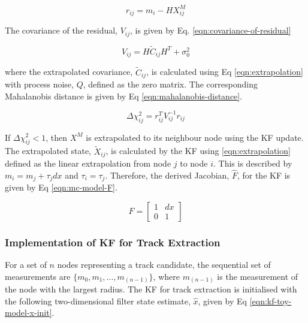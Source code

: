 \begin{equation}
r_{ij} = m_i - HX_{ij}^M
\label{eqn:residual}
\end{equation}

The covariance of the residual, $V_{ij}$, is given by Eq. \eqref{eqn:covariance-of-residual}

\begin{equation}
{V}_{ij} = H \widetilde{C}_{ij} H^{T} + \sigma_{0}^{2}
\label{eqn:covariance-of-residual}
\end{equation}

where the extrapolated covariance, $\widetilde{C}_{ij}$, is calculated using Eq \eqref{eqn:extrapolation} with process noise, $Q$, defined as the zero matrix. The corresponding Mahalanobis distance is given by Eq \eqref{eqn:mahalanobis-distance}.

\begin{equation}
\Delta \chi_{ij}^{2} = r_{ij}^{T} {V}_{ij}^{-1} r_{ij}
\label{eqn:mahalanobis-distance}
\end{equation}

If $\Delta \chi_{ij}^{2} < 1$, then $X^M$ is extrapolated to its neighbour node using the KF update. The extrapolated state, $\widetilde{X}_{ij}$, is calculated by the KF using \eqref{eqn:extrapolation} defined as the linear extrapolation from node $j$ to node $i$. This is described by $m_i = m_j + \tau_j dx$ and $\tau_i = \tau_j$. Therefore, the derived Jacobian, $\hat{F}$, for the KF is given by Eq \eqref{eqn:mc-model-F}.


\begin{equation}
\hat{F} = \begin{bmatrix} 1 & dx \\ 0 & 1 \end{bmatrix}
\label{eqn:mc-model-F}
\end{equation}



\subsubsection{Implementation of KF for Track Extraction}

For a set of $n$ nodes representing a track candidate, the sequential set of measurements are $\{m_0, m_1, ..., m_{(n-1)} \}$, where $m_{(n-1)}$ is the measurement of the node with the largest radius. The KF for track extraction is initialised with the following two-dimensional filter state estimate, $\hat{x}$, given by Eq \eqref{eqn:kf-toy-model-x-init}.

